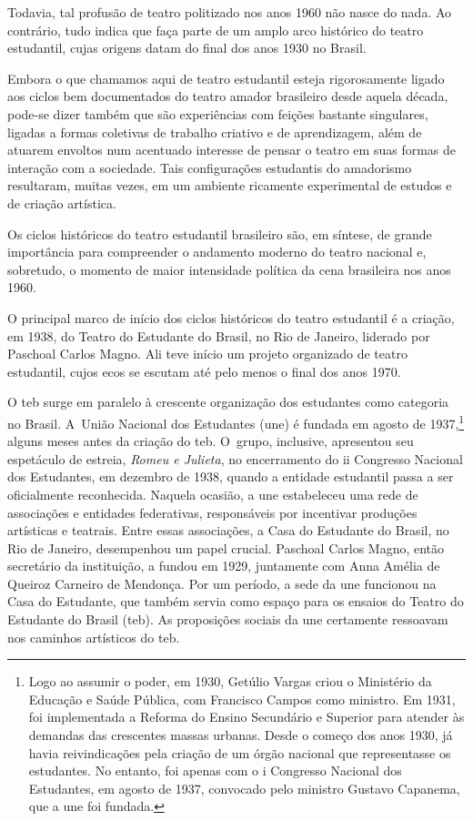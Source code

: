 Todavia, tal profusão de teatro politizado nos anos 1960 não nasce do
nada. Ao contrário, tudo indica que faça parte de um amplo arco
histórico do teatro estudantil, cujas origens datam do final dos anos
1930 no Brasil.

Embora o que chamamos aqui de teatro estudantil esteja rigorosamente
ligado aos ciclos bem documentados do teatro amador brasileiro desde
aquela década, pode-se dizer também que são experiências com feições
bastante singulares, ligadas a formas coletivas de trabalho criativo e
de aprendizagem, além de atuarem envoltos num acentuado interesse de
pensar o teatro em suas formas de interação com a sociedade. Tais
configurações estudantis do amadorismo resultaram, muitas vezes, em um
ambiente ricamente experimental de estudos e de criação artística.

Os ciclos históricos do teatro estudantil brasileiro são, em síntese,
de grande importância para compreender o andamento moderno do teatro
nacional e, sobretudo, o momento de maior intensidade política da cena
brasileira nos anos 1960.

\subject{Pedra angular: Teatro do Estudante do Brasil}

O principal marco de início dos ciclos históricos do teatro estudantil é
a criação, em 1938, do Teatro do Estudante do Brasil, no Rio de Janeiro,
liderado por Paschoal Carlos Magno. Ali teve início um projeto
organizado de teatro estudantil, cujos ecos se escutam até pelo menos o
final dos anos 1970.

O {\sc teb} surge em paralelo à crescente organização dos estudantes como
categoria no Brasil. A~União Nacional dos Estudantes ({\sc une}) é fundada em
agosto de 1937,\footnote{Logo ao assumir o poder, em 1930, Getúlio Vargas
  criou o Ministério da Educação e Saúde Pública, com Francisco Campos
  como ministro. Em 1931, foi implementada a Reforma do Ensino
  Secundário e Superior para atender às demandas das crescentes massas
  urbanas. Desde o começo dos anos 1930, já havia reivindicações pela
  criação de um órgão nacional que representasse os estudantes. No
  entanto, foi apenas com o {\sc i} Congresso Nacional dos Estudantes, em
  agosto de 1937, convocado pelo ministro Gustavo Capanema, que a {\sc une}
  foi fundada.} alguns meses antes da criação do {\sc teb}. O~grupo,
inclusive, apresentou seu espetáculo de estreia, {\it Romeu e Julieta},
no encerramento do {\sc ii} Congresso Nacional dos Estudantes, em dezembro de
1938, quando a entidade estudantil passa a ser oficialmente reconhecida.
Naquela ocasião, a {\sc une} estabeleceu uma rede de associações e entidades
federativas, responsáveis por incentivar produções artísticas e
teatrais. Entre essas associações, a Casa do Estudante do Brasil, no Rio
de Janeiro, desempenhou um papel crucial. Paschoal Carlos Magno, então
secretário da instituição, a fundou em 1929, juntamente com Anna Amélia
de Queiroz Carneiro de Mendonça. Por um período, a sede da {\sc une} funcionou
na Casa do Estudante, que também servia como espaço para os ensaios do
Teatro do Estudante do Brasil ({\sc teb}). As proposições sociais da {\sc une}
certamente ressoavam nos caminhos artísticos do {\sc teb}.

